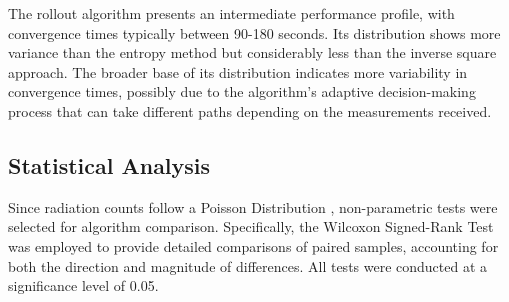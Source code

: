 \documentclass[../report.tex]{subfiles}
\begin{document}
    The rollout algorithm presents an intermediate performance profile, with convergence times typically between 90-180 seconds. Its distribution shows more variance than the entropy method but 
    considerably less than the inverse square approach. The broader base of its distribution indicates more variability in convergence times, possibly due to the algorithm's adaptive decision-making
    process that can take different paths depending on the measurements received.

    \subsection{Statistical Analysis}

    Since radiation counts follow a Poisson Distribution \cite{ristic2010information}, non-parametric tests were selected for algorithm comparison. Specifically, the Wilcoxon Signed-Rank Test was 
    employed to provide detailed comparisons of paired samples, accounting for both the direction and magnitude of differences. All tests were conducted at a significance level of 0.05.
    \vspace{0.3cm}
\end{document}
